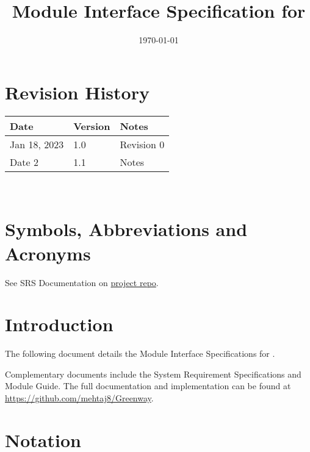\documentclass[12pt, titlepage]{article}
\begin{document}
\title{Module Interface Specification for \progname{}}

\author{\authname{}}

\date{\today}

\maketitle


\section{Revision History}

\begin{tabularx}{\textwidth}{p{3cm}p{2cm}X}
\toprule {\bf Date} & {\bf Version} & {\bf Notes}\\
\midrule
Jan 18, 2023 & 1.0 & Revision 0\\
Date 2 & 1.1 & Notes\\
\bottomrule
\end{tabularx}

~\newpage

\section{Symbols, Abbreviations and Acronyms}

See SRS Documentation on \href{https://github.com/mehtaj8/Greenway/blob/main/docs/SRS/SRS.pdf}{project repo}.

\newpage

\tableofcontents

\newpage


\section{Introduction}

The following document details the Module Interface Specifications for
\progname{}.

Complementary documents include the System Requirement Specifications
and Module Guide.  The full documentation and implementation can be
found at \url{https://github.com/mehtaj8/Greenway}.

\section{Notation}
\end{document}
